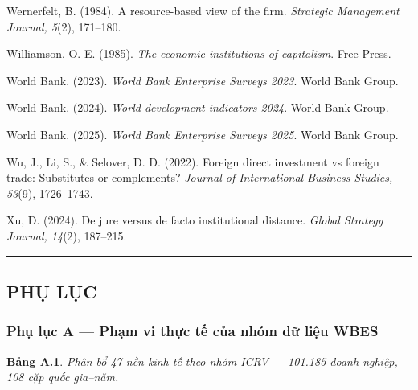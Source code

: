\documentclass[12pt,a4paper]{article}
\begin{document}
Wernerfelt, B. (1984). A resource-based view of the firm.
\emph{Strategic Management Journal, 5}(2), 171--180.

Williamson, O. E. (1985). \emph{The economic institutions of
capitalism}. Free Press.

World Bank. (2023). \emph{World Bank Enterprise Surveys 2023}. World
Bank Group.

World Bank. (2024). \emph{World development indicators 2024}. World Bank
Group.

World Bank. (2025). \emph{World Bank Enterprise Surveys 2025}. World
Bank Group.

Wu, J., Li, S., \& Selover, D. D. (2022). Foreign direct investment vs
foreign trade: Substitutes or complements? \emph{Journal of
International Business Studies, 53}(9), 1726--1743.

Xu, D. (2024). De jure versus de facto institutional distance.
\emph{Global Strategy Journal, 14}(2), 187--215.

\begin{center}\rule{0.5\linewidth}{0.5pt}\end{center}

\hypertarget{phux1ee5-lux1ee5c}{%
\subsection{PHỤ LỤC}\label{phux1ee5-lux1ee5c}}

\hypertarget{phux1ee5-lux1ee5c-a--phux1ea1m-vi-thux1ef1c-tux1ebf-cux1ee7a-nhuxf3m-dux1eef-liux1ec7u-wbes}{%
\subsubsection{Phụ lục A --- Phạm vi thực tế của nhóm dữ liệu
WBES}\label{phux1ee5-lux1ee5c-a--phux1ea1m-vi-thux1ef1c-tux1ebf-cux1ee7a-nhuxf3m-dux1eef-liux1ec7u-wbes}}

\textbf{Bảng A.1}. \emph{Phân bổ 47 nền kinh tế theo nhóm ICRV ---
101.185 doanh nghiệp, 108 cặp quốc gia--năm.}
\end{document}

